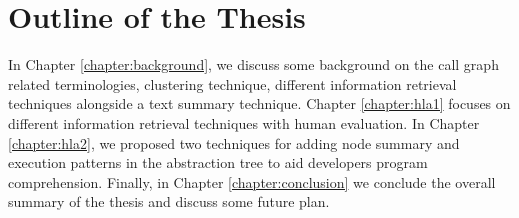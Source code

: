 
\section{Outline of the Thesis}
\label{intro:outline}

In Chapter \ref{chapter:background}, we discuss some background on the call graph related terminologies, clustering technique, different information retrieval techniques alongside a text summary technique. Chapter \ref{chapter:hla1} focuses on different information retrieval techniques with human evaluation. In Chapter \ref{chapter:hla2}, we proposed two techniques for adding node summary and execution patterns in the abstraction tree to aid developers program comprehension. Finally, in Chapter \ref{chapter:conclusion} we conclude the overall summary of the thesis and discuss some future plan. 
